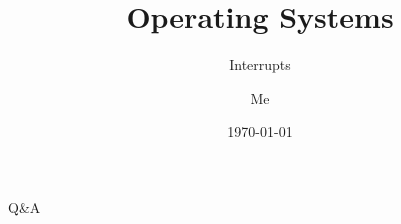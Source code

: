 \documentclass[12pt]{beamer}
\title{Operating Systems}
\subtitle{Interrupts}
\author{Me}
\date{\today}
\begin{document}
  \begin{frame}
    \titlepage
  \end{frame}

  

  \begin{frame}
  \begin{center}
  \Huge Q\&A
  \end{center}
  \end{frame}
\end{document}
